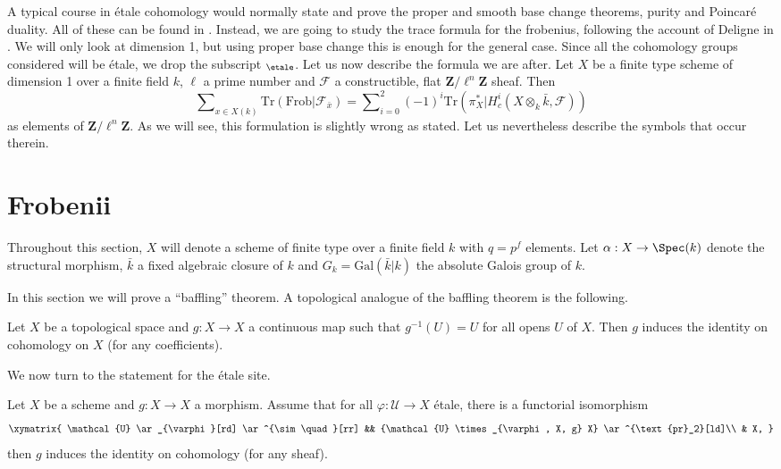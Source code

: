 \noindent
A typical course in \'etale cohomology would normally state and prove the
proper and smooth base change theorems, purity and Poincar\'e duality. All of
these can be found in \cite[Arcata]{SGA4.5}. Instead, we are going to study the
trace formula for the frobenius, following the account of Deligne in
\cite[Rapport]{SGA4.5}. We will only look at dimension 1, but using proper base
change this is enough for the general case. Since all the cohomology groups
considered will be \'etale, we drop the subscript $_\etale$. Let us
now describe
the formula we are after. Let $X$ be a finite type scheme of dimension 1 over a
finite field $k$, $\ell$ a prime number and $\mathcal{F}$ a constructible, flat
$\mathbf{Z}/\ell^n\mathbf{Z}$ sheaf. Then
\begin{equation}
\label{equation-trace-formula-initial}
\sum\nolimits_{x \in X(k)}
\text{Tr}(\text{Frob} | \mathcal{F}_{\bar x}) =
\sum\nolimits_{i=0}^2
(-1)^i \text{Tr}(\pi_X^* | H^i_c(X \otimes_k \bar k, \mathcal{F}))
\end{equation}
as elements of $\mathbf{Z}/\ell^n\mathbf{Z}$. As we will see, this formulation
is slightly wrong as stated. Let us nevertheless describe the symbols that
occur therein.




\section{Frobenii}
\label{section-frobenii}

\noindent
Throughout this section, $X$ will denote a scheme of finite type over a finite
field $k$ with $q = p^f$ elements. Let $\alpha : X \to \Spec(k)$ denote
the structural morphism, $\bar k$ a fixed algebraic closure of $k$ and $G_k =
\text{Gal}(\bar k | k)$ the absolute Galois group of $k$.

\medskip\noindent
In this section we will prove a ``baffling'' theorem.
A topological analogue of the baffling theorem is the following.

\begin{exercise}
\label{exercise-baffling}
Let $X$ be a topological space and $g : X \to X$ a continuous map such that
$g^{-1}(U) = U$ for all opens $U$ of $X$. Then $g$ induces the identity on
cohomology on $X$ (for any coefficients).
\end{exercise}

\noindent
We now turn to the statement for the \'etale site.

\begin{lemma}
\label{lemma-baffling}
Let $X$ be a scheme and $g : X \to X$ a morphism. Assume that for all $\varphi:
\mathcal{U} \to X$ \'etale, there is a functorial isomorphism
$$
\xymatrix{
\mathcal{U} \ar_{\varphi}[rd] \ar^{\sim \quad}[rr] && {\mathcal{U}
\times_{\varphi, X, g} X} \ar^{\text{pr}_2}[ld]\\
& X,
}
$$
then $g$ induces the identity on cohomology (for any sheaf).
\end{lemma}

